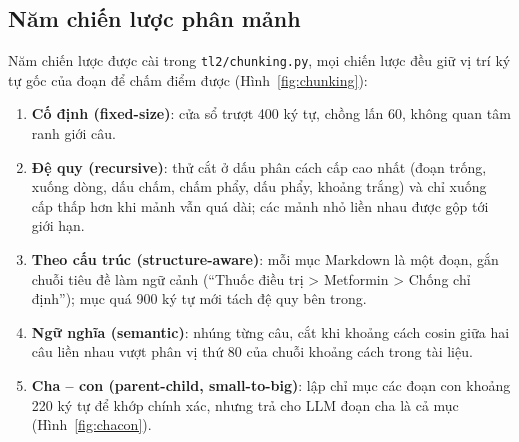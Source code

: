 

\subsection{Năm chiến lược phân mảnh}
Năm chiến lược được cài trong \texttt{tl2/chunking.py}, mọi chiến lược đều giữ vị trí ký tự gốc của đoạn để chấm
điểm được (Hình~\ref{fig:chunking}):

\begin{enumerate}
  \item \textbf{Cố định (fixed-size)}: cửa sổ trượt 400 ký tự, chồng lấn 60, không quan tâm ranh giới câu.
  \item \textbf{Đệ quy (recursive)}: thử cắt ở dấu phân cách cấp cao nhất (đoạn trống, xuống dòng, dấu chấm,
        chấm phẩy, dấu phẩy, khoảng trắng) và chỉ xuống cấp thấp hơn khi mảnh vẫn quá dài; các mảnh nhỏ liền nhau
        được gộp tới giới hạn.
  \item \textbf{Theo cấu trúc (structure-aware)}: mỗi mục Markdown là một đoạn, gắn chuỗi tiêu đề làm ngữ cảnh
        (``Thuốc điều trị > Metformin > Chống chỉ định''); mục quá 900 ký tự mới tách đệ quy bên trong.
  \item \textbf{Ngữ nghĩa (semantic)}: nhúng từng câu, cắt khi khoảng cách cosin giữa hai câu liền nhau vượt phân
        vị thứ 80 của chuỗi khoảng cách trong tài liệu.
  \item \textbf{Cha -- con (parent-child, small-to-big)}: lập chỉ mục các đoạn con khoảng 220 ký tự để khớp chính
        xác, nhưng trả cho LLM đoạn cha là cả mục (Hình~\ref{fig:chacon}).
\end{enumerate}




